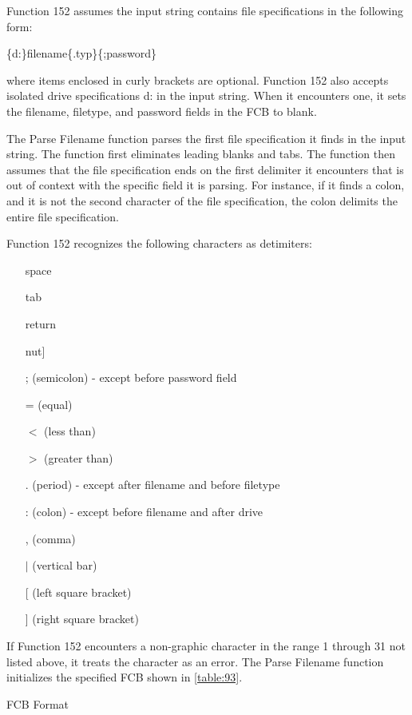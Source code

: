 Function 152 assumes the input string contains file specifications in
the following form:

\{d:\}filename\{.typ\}\{;password\}

where items enclosed in curly brackets are optional. Function 152 also
accepts isolated drive specifications d: in the input string. When it
encounters one, it sets the filename, filetype, and password fields in
the FCB to blank.

The Parse Filename function parses the first file specification it
finds in the input string. The function first eliminates leading
blanks and tabs. The function then assumes that the file specification
ends on the first delimiter it encounters that is out of context with
the specific field it is parsing. For instance, if it finds a colon,
and it is not the second character of the file specification, the
colon delimits the entire file specification.

Function 152 recognizes the following characters as detimiters:

\begin{itemize}
\item[] space
\item[] tab
\item[] return
\item[] nut]
\item[] ; (semicolon) - except before password field
\item[] = (equal)
\item[] \(<\) (less than)
\item[] \(>\) (greater than)
\item[] . (period) - except after filename and before filetype
\item[] : (colon) - except before filename and after drive
\item[] , (comma)
\item[] \(|\) (vertical bar)
\item[] [ (left square bracket)
\item[] ] (right square bracket)
\end{itemize}

If Function 152 encounters a non-graphic character in the range 1
through 31 not listed above, it treats the character as an error. The
Parse Filename function initializes the specified FCB shown in
\ref{table:93}.

\begin{table}[ht]\centering
  \caption{FCB Format}
  \label{table:93}
\end{table}

